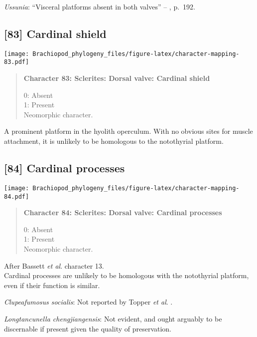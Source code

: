 \documentclass[openany]{book}
\theoremstyle{definition}
\theoremstyle{definition}
\theoremstyle{definition}
\theoremstyle{remark}
\begin{document}
\hypertarget{Ussunia-coding-82}{}
\emph{Ussunia}: ``Visceral platforms absent in both valves'' --
\citet{Williams2000LinguliformeaCraniiformea}, p.~192.

\subsection*{{[}83{]} Cardinal shield}\label{cardinal-shield}

\texttt{[image: Brachiopod\_phylogeny\_files/figure-latex/character-mapping-83.pdf]}

\begin{quote}
\textbf{Character 83: Sclerites: Dorsal valve: Cardinal shield}

0: Absent\\
1: Present\\
Neomorphic character.
\end{quote}

A prominent platform in the hyolith operculum. With no obvious sites for
muscle attachment, it is unlikely to be homologous to the notothyrial
platform.

\subsection*{{[}84{]} Cardinal processes}\label{cardinal-processes}

\texttt{[image: Brachiopod\_phylogeny\_files/figure-latex/character-mapping-84.pdf]}

\begin{quote}
\textbf{Character 84: Sclerites: Dorsal valve: Cardinal processes}

0: Absent\\
1: Present\\
Neomorphic character.
\end{quote}

After Bassett \emph{et al}.
\citeyearpar{Bassett2001Functionalmorphology} character 13.\\
Cardinal processes are unlikely to be homologous with the notothyrial
platform, even if their function is similar.

\hypertarget{Clupeafumosus_socialis-coding-84}{}
\emph{Clupeafumosus socialis}: Not reported by Topper \emph{et al}.
\citeyearpar{Topper2013Reappraisalof}.

\hypertarget{Longtancunella_chengjiangensis-coding-84}{}
\emph{Longtancunella chengjiangensis}: Not evident, and ought arguably
to be discernable if present given the quality of preservation.
\end{document}
